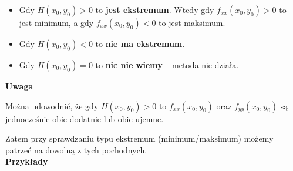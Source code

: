 \begin{itemize}
    \item Gdy $ H(x_0, y_0) > 0 $ to \textbf{jest ekstremum}. Wtedy gdy $ f_{xx}(x_0, y_0) > 0 $ to jest minimum,
    a gdy $ f_{xx}(x_0, y_0) < 0 $ to jest maksimum.
    \item Gdy $ H(x_0, y_0) < 0 $ to \textbf{nie ma ekstremum}.
    \item Gdy $ H(x_0, y_0) = 0 $ to \textbf{nic nie wiemy} -- metoda nie działa.
\end{itemize}

\textbf{Uwaga}

Można udowodnić, że gdy $ H(x_0, y_0) > 0 $ to $ f_{xx}(x_0, y_0) $ oraz $ f_{yy}(x_0, y_0) $ są jednocześnie obie dodatnie
lub obie ujemne.

Zatem przy sprawdzaniu typu ekstremum (minimum/maksimum) możemy patrzeć na dowolną z tych pochodnych. \\

\textbf{Przykłady}

